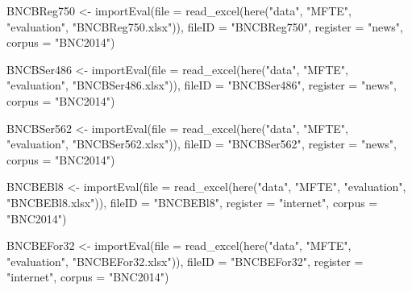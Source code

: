 \documentclass[
  letterpaper,
  DIV=11,
  numbers=noendperiod]{scrreprt}
\newenvironment{Shaded}{\begin{snugshade}}{\end{snugshade}}
\newcommand{\AttributeTok}[1]{\textcolor[rgb]{0.40,0.45,0.13}{#1}}
\newcommand{\FunctionTok}[1]{\textcolor[rgb]{0.28,0.35,0.67}{#1}}
\newcommand{\NormalTok}[1]{\textcolor[rgb]{0.00,0.23,0.31}{#1}}
\newcommand{\OtherTok}[1]{\textcolor[rgb]{0.00,0.23,0.31}{#1}}
\newcommand{\StringTok}[1]{\textcolor[rgb]{0.13,0.47,0.30}{#1}}
\begin{document}
\begin{Shaded}
\begin{Highlighting}[]
\NormalTok{BNCBReg750 }\OtherTok{\textless{}{-}} \FunctionTok{importEval}\NormalTok{(}\AttributeTok{file =} \FunctionTok{read\_excel}\NormalTok{(}\FunctionTok{here}\NormalTok{(}\StringTok{"data"}\NormalTok{, }\StringTok{"MFTE"}\NormalTok{, }\StringTok{"evaluation"}\NormalTok{, }\StringTok{"BNCBReg750.xlsx"}\NormalTok{)), }\AttributeTok{fileID =} \StringTok{"BNCBReg750"}\NormalTok{, }\AttributeTok{register =} \StringTok{"news"}\NormalTok{, }\AttributeTok{corpus =} \StringTok{"BNC2014"}\NormalTok{)}

\NormalTok{BNCBSer486 }\OtherTok{\textless{}{-}} \FunctionTok{importEval}\NormalTok{(}\AttributeTok{file =} \FunctionTok{read\_excel}\NormalTok{(}\FunctionTok{here}\NormalTok{(}\StringTok{"data"}\NormalTok{, }\StringTok{"MFTE"}\NormalTok{, }\StringTok{"evaluation"}\NormalTok{, }\StringTok{"BNCBSer486.xlsx"}\NormalTok{)), }\AttributeTok{fileID =} \StringTok{"BNCBSer486"}\NormalTok{, }\AttributeTok{register =} \StringTok{"news"}\NormalTok{, }\AttributeTok{corpus =} \StringTok{"BNC2014"}\NormalTok{)}

\NormalTok{BNCBSer562 }\OtherTok{\textless{}{-}} \FunctionTok{importEval}\NormalTok{(}\AttributeTok{file =} \FunctionTok{read\_excel}\NormalTok{(}\FunctionTok{here}\NormalTok{(}\StringTok{"data"}\NormalTok{, }\StringTok{"MFTE"}\NormalTok{, }\StringTok{"evaluation"}\NormalTok{, }\StringTok{"BNCBSer562.xlsx"}\NormalTok{)), }\AttributeTok{fileID =} \StringTok{"BNCBSer562"}\NormalTok{, }\AttributeTok{register =} \StringTok{"news"}\NormalTok{, }\AttributeTok{corpus =} \StringTok{"BNC2014"}\NormalTok{)}

\NormalTok{BNCBEBl8 }\OtherTok{\textless{}{-}} \FunctionTok{importEval}\NormalTok{(}\AttributeTok{file =} \FunctionTok{read\_excel}\NormalTok{(}\FunctionTok{here}\NormalTok{(}\StringTok{"data"}\NormalTok{, }\StringTok{"MFTE"}\NormalTok{, }\StringTok{"evaluation"}\NormalTok{, }\StringTok{"BNCBEBl8.xlsx"}\NormalTok{)), }\AttributeTok{fileID =} \StringTok{"BNCBEBl8"}\NormalTok{, }\AttributeTok{register =} \StringTok{"internet"}\NormalTok{, }\AttributeTok{corpus =} \StringTok{"BNC2014"}\NormalTok{)}

\NormalTok{BNCBEFor32 }\OtherTok{\textless{}{-}} \FunctionTok{importEval}\NormalTok{(}\AttributeTok{file =} \FunctionTok{read\_excel}\NormalTok{(}\FunctionTok{here}\NormalTok{(}\StringTok{"data"}\NormalTok{, }\StringTok{"MFTE"}\NormalTok{, }\StringTok{"evaluation"}\NormalTok{, }\StringTok{"BNCBEFor32.xlsx"}\NormalTok{)), }\AttributeTok{fileID =} \StringTok{"BNCBEFor32"}\NormalTok{, }\AttributeTok{register =} \StringTok{"internet"}\NormalTok{, }\AttributeTok{corpus =} \StringTok{"BNC2014"}\NormalTok{)}


\end{Highlighting}
\end{Shaded}
\end{document}
